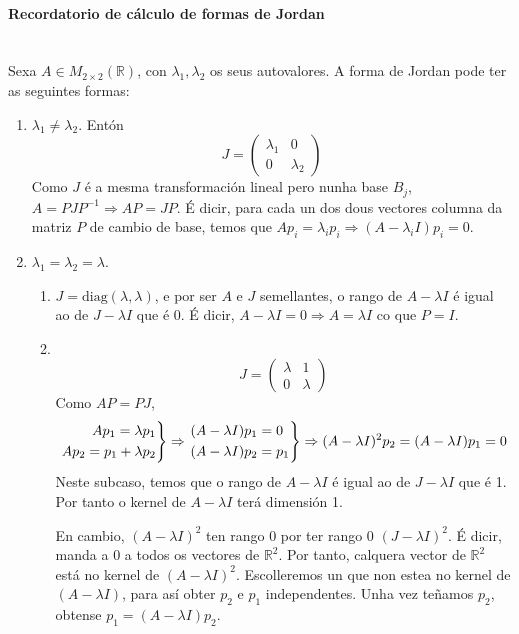 \documentclass[11pt, a4paper,twoside]{article}
\theoremstyle{theorem-style}  %
\theoremstyle{definition-style}
\theoremstyle{example-style}
\newenvironment{rcases}
{\left.\begin{aligned}}
	{\end{aligned}\right\rbrace}
\begin{document}
\paragraph{Recordatorio de cálculo de formas de Jordan}\ \\
	Sexa $ A\in M_{2\times 2}(\mathbb{R}) $, con $ \lambda_1, \lambda_2 $ os seus autovalores. A forma de Jordan pode ter as seguintes formas:
	\begin{enumerate}
		\item $ \lambda_1\neq \lambda_2 $. Entón 
		\[ J=\begin{pmatrix}
		\lambda_1 &0\\
		0 &\lambda_2
		\end{pmatrix} \]
		Como $ J $ é a mesma transformación lineal pero nunha base $ B_j $, $ A=PJP^{-1} \Rightarrow AP=JP$. É dicir, para cada un dos dous vectores columna da matriz $ P $ de cambio de base, temos que $ Ap_i=\lambda_ip_i \Rightarrow (A-\lambda_iI)p_i=0$.
		\item $ \lambda_1= \lambda_2=\lambda $.
		\begin{enumerate}
			\item $ J=\text{diag}(\lambda,\lambda) $, e por ser $ A $ e $ J $ semellantes, o rango de $ A-\lambda I $ é igual ao de $ J-\lambda I $ que é 0. É dicir, $ A-\lambda I =0 \Rightarrow A=\lambda I $ co que $ P=I $.
			\item \ 
			\[ J=\begin{pmatrix}
			\lambda &1\\
			0 &\lambda
			\end{pmatrix} \]
			Como $ AP=PJ $,
			\[ \begin{rcases}
			 Ap_1 = \lambda p_1\\
			 Ap_2 = p_1 + \lambda p_2
			\end{rcases} \Rightarrow \begin{rcases}
			&(A-\lambda I) p_1=0\\
			&(A-\lambda I) p_2=p_1
			\end{rcases}\Rightarrow  (A-\lambda I)^2p_2= (A-\lambda I) p_1=0   \]
			Neste subcaso, temos que o rango de $ A-\lambda I $ é igual ao de $ J-\lambda I $ que é 1. Por tanto o kernel de $ A-\lambda I $ terá dimensión 1.
			
			En cambio, $ (A-\lambda I)^2 $ ten rango 0 por ter rango 0 $ (J-\lambda I)^2 $. É dicir, manda a 0 a todos os vectores de $ \mathbb{R}^2 $. Por tanto, calquera vector de $ \mathbb{R}^2 $ está no kernel de $ (A-\lambda I)^2 $. Escolleremos un que non estea no kernel de $ (A-\lambda I) $, para así obter $ p_2 $ e $ p_1 $ independentes. Unha vez teñamos $ p_2 $, obtense $ p_1= (A-\lambda I) p_2$.			
		\end{enumerate}
	\end{enumerate}
\end{document}
